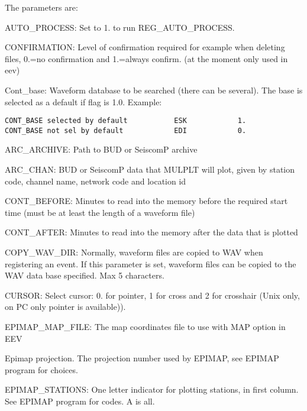 The parameters are: 

AUTO\_PROCESS: Set to 1. to run REG\_AUTO\_PROCESS.

CONFIRMATION: Level of confirmation required for example when deleting files, 0.=no confirmation and 
1.=always confirm. (at the moment only used in eev) 

Cont\_base: Waveform database to be searched (there can be several). The base is selected as a default if flag is 1.0. Example: 

\begin{verbatim}
CONT_BASE selected by default           ESK            1.
CONT_BASE not sel by default            EDI            0. 
\end{verbatim}

ARC\_ARCHIVE: Path to BUD or SeiscomP archive 

ARC\_CHAN: BUD or SeiscomP data that MULPLT will plot, given by station code, channel name, network code and location id

CONT\_BEFORE: Minutes to read into the memory before the required start time (must  be at least the length of a waveform file) 

CONT\_AFTER: Minutes to read into the memory after the data that is plotted

COPY\_WAV\_DIR: Normally, waveform files are copied to WAV when registering an event. If this parameter is set, waveform files can be copied to the WAV data base specified. Max 5 characters. 

CURSOR: Select cursor: 0. for pointer, 1 for cross and 2 for crosshair (Unix only, on PC only pointer 
is available)). 

EPIMAP\_MAP\_FILE: The map coordinates file to use with MAP option in EEV 

Epimap projection. The projection number used by EPIMAP, see EPIMAP program for choices.

EPIMAP\_STATIONS: One letter indicator for plotting stations, in first column. See EPIMAP program for codes. A is all. 

